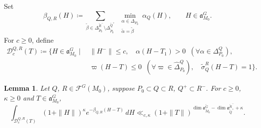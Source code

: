 \documentclass[12pt]{amsart}
\theoremstyle{definition}
\theoremstyle{plain}
\newtheorem{lemma}[definition]{Lemma}
\theoremstyle{remark}
\newcommand{\fa}{\mathfrak{a}}
\newcommand{\cD}{\mathcal{D}}
\newcommand{\cF}{\mathcal{F}}
\numberwithin{equation}{section}
\newcommand{\tG}{\widetilde{G}}
\newcommand{\tM}{\widetilde{M}}
\newcommand{\tP}{\widetilde{P}}
\newcommand{\tQ}{\widetilde{Q}}
\newcommand{\tR}{\widetilde{R}}
\newcommand{\talpha}{\widetilde{\alpha}}
\newcommand{\tbeta}{\widetilde{\beta}}
\begin{document}
Set 
\[
\beta_{Q,R}(H)\coloneqq \sum_{\tbeta\in
       \Delta_{\tP_0}^{\tR^-}\setminus\Delta_{\tP_0}^{\tQ^+}}
       \ \min_{\substack{\alpha\in\Delta_{P_0}\\
                         \talpha=\tbeta}}
       \alpha_{Q}(H) ,\qquad  H\in \fa_{M_0}^G.
\]
For $c\geq0$, define
\begin{align*}
 \mathcal D_c^{Q,R}(T)\coloneqq \{H\in \fa_{M_0}^G \mid & \ \|H^-\|\leq c,\quad
       \alpha(H-T_1)>0\;\; (\forall\alpha\in \Delta_{P_0}^Q), \\
  &    \ \varpi(H-T)\leq0\;\; (\forall\varpi\in\widehat\Delta_{P_0}^Q),\quad \widetilde\sigma_Q^R(H-T)=1\}.    
\end{align*}
\begin{lemma}\label{lem:fsa-cone-integral}
Let $Q$, $R\in\cF^G(M_0)$, suppose $P_0\subset Q\subset R$, $Q^+\subset R^-$. 
For $c\ge 0$, $\kappa\geq0$ and $T\in \fa_{M_0}^G$,
\begin{equation*}
 \int_{\cD_c^{Q,R}(T)}
       (1+\|H\|)^\kappa e^{-\beta_{Q,R}(H-T)}\,dH
 \ll_{c,\kappa}
       (1+\|T\|)^{\dim \fa_{\tM_0}^{\tG}-\dim\fa_{\tQ^+}^{\tR^-}+\kappa}.
\end{equation*}
\end{lemma}
\end{document}
